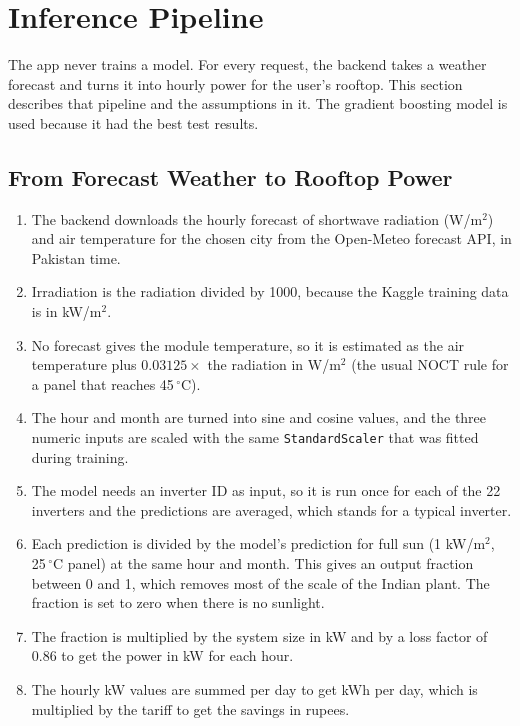 \section{Inference Pipeline}
The app never trains a model. For every request, the backend takes a weather
forecast and turns it into hourly power for the user's rooftop. This section
describes that pipeline and the assumptions in it. The gradient boosting model
is used because it had the best test results.

\subsection{From Forecast Weather to Rooftop Power}
\begin{enumerate}
  \item The backend downloads the hourly forecast of shortwave radiation
        (W/m$^2$) and air temperature for the chosen city from the Open-Meteo
        forecast API, in Pakistan time.
  \item Irradiation is the radiation divided by 1000, because the Kaggle
        training data is in kW/m$^2$.
  \item No forecast gives the module temperature, so it is estimated as the
        air temperature plus $0.03125 \times$ the radiation in W/m$^2$ (the
        usual NOCT rule for a panel that reaches 45\,$^{\circ}$C).
  \item The hour and month are turned into sine and cosine values, and the
        three numeric inputs are scaled with the same \texttt{StandardScaler}
        that was fitted during training.
  \item The model needs an inverter ID as input, so it is run once for each
        of the 22 inverters and the predictions are averaged, which stands for
        a typical inverter.
  \item Each prediction is divided by the model's prediction for full sun
        (1 kW/m$^2$, 25\,$^{\circ}$C panel) at the same hour and month. This
        gives an output fraction between 0 and 1, which removes most of the
        scale of the Indian plant. The fraction is set to zero when there is
        no sunlight.
  \item The fraction is multiplied by the system size in kW and by a loss
        factor of 0.86 to get the power in kW for each hour.
  \item The hourly kW values are summed per day to get kWh per day, which is
        multiplied by the tariff to get the savings in rupees.
\end{enumerate}

